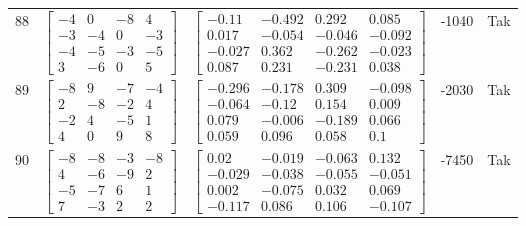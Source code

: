 \documentclass[a4paper,12pt]{article}
\begin{document}
\begin{tabular}{c c c c c}
88
&
$\begin{bmatrix} -4 & 0 & -8 & 4 \\ -3 & -4 & 0 & -3 \\ -4 & -5 & -3 & -5 \\ 3 & -6 & 0 & 5 \end{bmatrix}$
&
$\begin{bmatrix} -0.11 & -0.492 & 0.292 & 0.085 \\ 0.017 & -0.054 & -0.046 & -0.092 \\ -0.027 & 0.362 & -0.262 & -0.023 \\ 0.087 & 0.231 & -0.231 & 0.038 \end{bmatrix}$
&
-1040
&
Tak
\\
89
&
$\begin{bmatrix} -8 & 9 & -7 & -4 \\ 2 & -8 & -2 & 4 \\ -2 & 4 & -5 & 1 \\ 4 & 0 & 9 & 8 \end{bmatrix}$
&
$\begin{bmatrix} -0.296 & -0.178 & 0.309 & -0.098 \\ -0.064 & -0.12 & 0.154 & 0.009 \\ 0.079 & -0.006 & -0.189 & 0.066 \\ 0.059 & 0.096 & 0.058 & 0.1 \end{bmatrix}$
&
-2030
&
Tak
\\
90
&
$\begin{bmatrix} -8 & -8 & -3 & -8 \\ 4 & -6 & -9 & 2 \\ -5 & -7 & 6 & 1 \\ 7 & -3 & 2 & 2 \end{bmatrix}$
&
$\begin{bmatrix} 0.02 & -0.019 & -0.063 & 0.132 \\ -0.029 & -0.038 & -0.055 & -0.051 \\ 0.002 & -0.075 & 0.032 & 0.069 \\ -0.117 & 0.086 & 0.106 & -0.107 \end{bmatrix}$
&
-7450
&
Tak
\\
\end{tabular} \egroup \newpage
\end{document}
